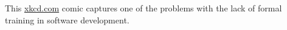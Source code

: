 \label{fig:xkcd}

This \href{https://xkcd.com/1513/}{xkcd.com} comic captures one of the problems with the lack of formal training in software development.
  
  
  
  
  